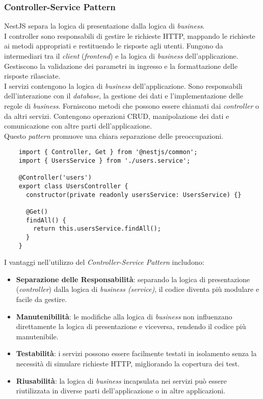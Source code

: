 \subsubsection{Controller-Service Pattern}
NestJS separa la logica di presentazione dalla logica di \textit{business}. \\
I controller sono responsabili di gestire le richieste HTTP, mappando le richieste ai metodi appropriati e restituendo le risposte agli utenti.
Fungono da intermediari tra il \textit{client} (\textit{frontend}) e la logica di \textit{business} dell'applicazione.
Gestiscono la validazione dei parametri in ingresso e la formattazione delle risposte rilasciate.\\
I servizi contengono la logica di \textit{business} dell'applicazione. 
Sono responsabili dell'interazione con il \textit{database}, la gestione dei dati e l'implementazione delle regole di \textit{business}.
Forniscono metodi che possono essere chiamati dai \textit{controller} o da altri servizi.
Contengono operazioni CRUD, manipolazione dei dati e comunicazione con altre parti dell'applicazione.\\
Questo \textit{pattern} promuove una chiara separazione delle preoccupazioni.
\begin{lstlisting}
	import { Controller, Get } from '@nestjs/common';
	import { UsersService } from './users.service';
	
	@Controller('users')
	export class UsersController {
	  constructor(private readonly usersService: UsersService) {}
	
	  @Get()
	  findAll() {
		return this.usersService.findAll();
	  }
	}
\end{lstlisting}
I vantaggi nell'utilizzo del \textit{Controller-Service Pattern} includono:
\begin{itemize}
	\item \textbf{Separazione delle Responsabilità}: separando la logica di presentazione (\textit{controller}) dalla logica di \textit{business (service)}, il codice diventa più modulare e facile da gestire.
	\item \textbf{Manutenibilità}: le modifiche alla logica di \textit{business} non influenzano direttamente la logica di presentazione e viceversa, rendendo il codice più manutenibile.
	\item \textbf{Testabilità}: i servizi possono essere facilmente testati in isolamento senza la necessità di simulare richieste HTTP, migliorando la copertura dei test.
	\item \textbf{Riusabilità}: la logica di \textit{business} incapsulata nei servizi può essere riutilizzata in diverse parti dell'applicazione o in altre applicazioni.
\end{itemize}


